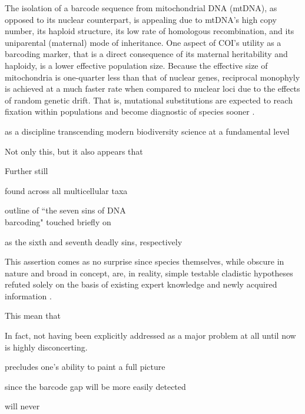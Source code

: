 The isolation of a barcode sequence from mitochondrial DNA (mtDNA), as opposed to its nuclear counterpart, is appealing due to mtDNA's high copy number, its haploid structure, its low rate of homologous recombination, and its uniparental (maternal) mode of inheritance. One aspect of COI's utility as a barcoding marker, that is a direct consequence of its maternal heritability and haploidy, is a lower effective population size. Because the effective size of mitochondria is one-quarter less than that of nuclear genes, reciprocal monophyly is achieved at a much faster rate when compared to nuclear loci due to the effects of random genetic drift. That is, mutational substitutions are expected to reach fixation within populations and become diagnostic of species sooner \cite{hubert2015dna}.

as a discipline transcending modern biodiversity science at a fundamental level

Not only this, but it also appears that

Further still

found across all multicellular taxa

outline of ``the seven sins of DNA \\ barcoding" touched briefly on 

as the sixth and seventh deadly sins, respectively

This assertion comes as no surprise since species themselves, while obscure in nature and broad in concept, are, in reality, simple testable cladistic hypotheses refuted solely on the basis of existing expert knowledge and newly acquired information \cite{pante2015species}.


This mean that

In fact, not having been explicitly addressed as a major problem at all until now is highly disconcerting.

precludes one's ability to paint a full picture

since the barcode gap will be more easily detected

will never

